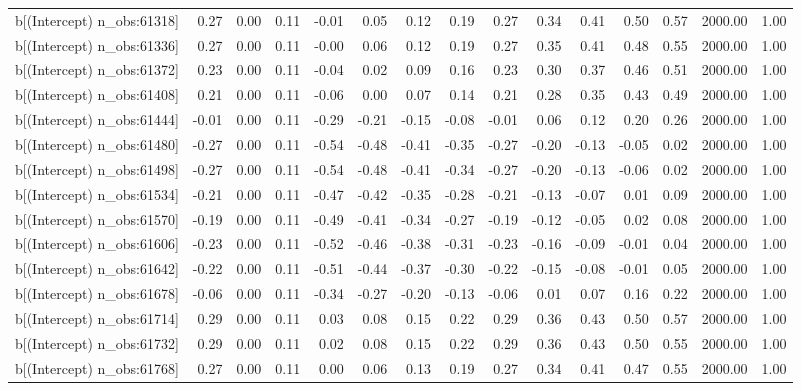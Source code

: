 \begin{table}[ht]
\begin{tabular}{rrrrrrrrrrrrrrr}
  b[(Intercept) n\_obs:61318] & 0.27 & 0.00 & 0.11 & -0.01 & 0.05 & 0.12 & 0.19 & 0.27 & 0.34 & 0.41 & 0.50 & 0.57 & 2000.00 & 1.00 \\ 
  b[(Intercept) n\_obs:61336] & 0.27 & 0.00 & 0.11 & -0.00 & 0.06 & 0.12 & 0.19 & 0.27 & 0.35 & 0.41 & 0.48 & 0.55 & 2000.00 & 1.00 \\ 
  b[(Intercept) n\_obs:61372] & 0.23 & 0.00 & 0.11 & -0.04 & 0.02 & 0.09 & 0.16 & 0.23 & 0.30 & 0.37 & 0.46 & 0.51 & 2000.00 & 1.00 \\ 
  b[(Intercept) n\_obs:61408] & 0.21 & 0.00 & 0.11 & -0.06 & 0.00 & 0.07 & 0.14 & 0.21 & 0.28 & 0.35 & 0.43 & 0.49 & 2000.00 & 1.00 \\ 
  b[(Intercept) n\_obs:61444] & -0.01 & 0.00 & 0.11 & -0.29 & -0.21 & -0.15 & -0.08 & -0.01 & 0.06 & 0.12 & 0.20 & 0.26 & 2000.00 & 1.00 \\ 
  b[(Intercept) n\_obs:61480] & -0.27 & 0.00 & 0.11 & -0.54 & -0.48 & -0.41 & -0.35 & -0.27 & -0.20 & -0.13 & -0.05 & 0.02 & 2000.00 & 1.00 \\ 
  b[(Intercept) n\_obs:61498] & -0.27 & 0.00 & 0.11 & -0.54 & -0.48 & -0.41 & -0.34 & -0.27 & -0.20 & -0.13 & -0.06 & 0.02 & 2000.00 & 1.00 \\ 
  b[(Intercept) n\_obs:61534] & -0.21 & 0.00 & 0.11 & -0.47 & -0.42 & -0.35 & -0.28 & -0.21 & -0.13 & -0.07 & 0.01 & 0.09 & 2000.00 & 1.00 \\ 
  b[(Intercept) n\_obs:61570] & -0.19 & 0.00 & 0.11 & -0.49 & -0.41 & -0.34 & -0.27 & -0.19 & -0.12 & -0.05 & 0.02 & 0.08 & 2000.00 & 1.00 \\ 
  b[(Intercept) n\_obs:61606] & -0.23 & 0.00 & 0.11 & -0.52 & -0.46 & -0.38 & -0.31 & -0.23 & -0.16 & -0.09 & -0.01 & 0.04 & 2000.00 & 1.00 \\ 
  b[(Intercept) n\_obs:61642] & -0.22 & 0.00 & 0.11 & -0.51 & -0.44 & -0.37 & -0.30 & -0.22 & -0.15 & -0.08 & -0.01 & 0.05 & 2000.00 & 1.00 \\ 
  b[(Intercept) n\_obs:61678] & -0.06 & 0.00 & 0.11 & -0.34 & -0.27 & -0.20 & -0.13 & -0.06 & 0.01 & 0.07 & 0.16 & 0.22 & 2000.00 & 1.00 \\ 
  b[(Intercept) n\_obs:61714] & 0.29 & 0.00 & 0.11 & 0.03 & 0.08 & 0.15 & 0.22 & 0.29 & 0.36 & 0.43 & 0.50 & 0.57 & 2000.00 & 1.00 \\ 
  b[(Intercept) n\_obs:61732] & 0.29 & 0.00 & 0.11 & 0.02 & 0.08 & 0.15 & 0.22 & 0.29 & 0.36 & 0.43 & 0.50 & 0.55 & 2000.00 & 1.00 \\ 
  b[(Intercept) n\_obs:61768] & 0.27 & 0.00 & 0.11 & 0.00 & 0.06 & 0.13 & 0.19 & 0.27 & 0.34 & 0.41 & 0.47 & 0.55 & 2000.00 & 1.00 \\ 

\end{tabular}
\end{table}
